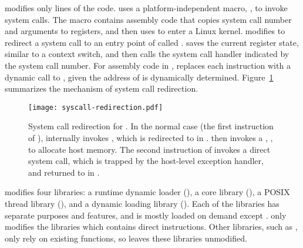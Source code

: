 \graphene{} modifies only \gipclines{} lines of the \glibc{} code.
\glibc{} uses a platform-independent macro,
,
to invoke system calls.
The macro  contains assembly code
that copies system call number and arguments to registers,
and then uses  to enter a Linux kernel.
\graphene{} modifies 
to redirect a system call to
an entry point of \thelibos{} called .
 saves the current register state, similar to a context switch,
and then
calls the system call handler
indicated by the system call number.
For assembly code in \glibc{},
\graphene{} replaces each  instruction with
a dynamic call to
, given the address of  is dynamically determined.
Figure~\ref{fig:libos:syscall-redirection} summarizes the mechanism of system call redirection.


\begin{figure}[t!]
\centering
\texttt{[image: syscall-redirection.pdf]}
\footnotesize
\caption{System call redirection for \thelibos{}.
In the normal case (the first instruction of ),  internally invokes 
, which is redirected to  in \thelibos{}.\thelibos{} then invokes a \hostapi{}, , to allocate host memory. The second instruction of  invokes a direct system call, which is trapped by the host-level exception handler,
and returned to  in \thelibos{}.}
\label{fig:libos:syscall-redirection}
\end{figure}


\graphene{} modifies four \glibc{} libraries:
a runtime dynamic loader (), a core library (), a POSIX thread library (\libpthread{}), and a dynamic loading library (\libdl{}).
Each of the \Glibc{} libraries has separate purposes and features,
and is mostly loaded on demand except .
\graphene{} only modifies the \glibc{} libraries which contains direct  instructions.
Other libraries, such as ,
only rely on 
existing \libc{} functions,
so \graphene{} leaves these libraries unmodified.



